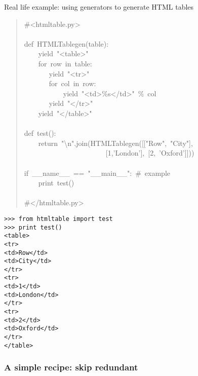 \documentclass[10pt,a4paper,english]{article}
\begin{document}
Real life example: using generators to generate HTML tables
\begin{quote}{\ttfamily \raggedright \noindent
{\#}<htmltable.py>~\\
~\\
def~HTMLTablegen(table):~\\
~~~~yield~"<table>"~\\
~~~~for~row~in~table:~\\
~~~~~~~yield~"<tr>"~\\
~~~~~~~for~col~in~row:~\\
~~~~~~~~~~~yield~"<td>{\%}s</td>"~{\%}~col~\\
~~~~~~~yield~"</tr>"~\\
~~~~yield~"</table>"~\\
~\\
def~test():~\\
~~~~return~"{\textbackslash}n".join(HTMLTablegen({[}{[}"Row",~"City"],~~\\
~~~~~~~~~~~~~~~~~~~~~~~{[}1,'London'],~{[}2,~'Oxford']]))~\\
~\\
if~{\_}{\_}name{\_}{\_}~==~"{\_}{\_}main{\_}{\_}":~{\#}~example~\\
~~~~print~test()~\\
~\\
{\#}</htmltable.py>
}\end{quote}
\begin{verbatim}>>> from htmltable import test
>>> print test()
<table>
<tr>
<td>Row</td>
<td>City</td>
</tr>
<tr>
<td>1</td>
<td>London</td>
</tr>
<tr>
<td>2</td>
<td>Oxford</td>
</tr>
</table>\end{verbatim}



\hypertarget{a-simple-recipe-skip-redundant}{}
\subsubsection*{A simple recipe: skip redundant}
\end{document}

